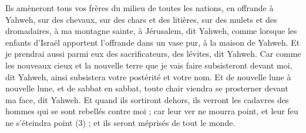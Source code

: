 \begin{multicols}{2}
Ils amèneront tous vos frères du milieu de toutes les nations, en offrande à Yahweh, sur des chevaux, sur des chars et des litières, sur des mulets et des dromadaires, à ma montagne sainte, à Jérusalem, dit Yahweh, comme lorsque les enfants d'Israël apportent l'offrande dans un vase pur, à la maison de Yahweh.
Et je prendrai aussi parmi eux des sacrificateurs, des lévites, dit Yahweh.
Car comme les nouveaux cieux et la nouvelle terre que je vais faire subsisteront devant moi, dit Yahweh, ainsi subsistera votre postérité et votre nom.
Et de nouvelle lune à nouvelle lune, et de sabbat en sabbat, toute chair viendra se prosterner devant ma face, dit Yahweh.
Et quand ils sortiront dehors, ils verront les cadavres des hommes qui se sont rebellés contre moi ; car leur ver ne mourra point, et leur feu ne s’éteindra point (3) ; et ils seront méprisés de tout le monde.
\PPE{}
\end{multicols}
